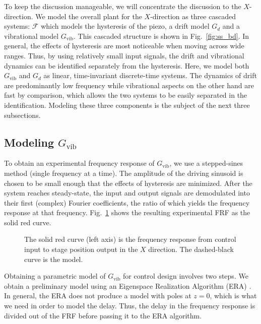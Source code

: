 \documentclass[twocolumn,twoside]{IEEEtran}
\newcommand{\Gv}{\ensuremath{G_{\text{vib}}}\xspace}
\begin{document}
To keep the discussion manageable, we will concentrate the discussion to the $X$-direction. We model the overall plant for the $X$-direction as three cascaded systems: $\mathcal{F}$ which models the hysteresis of the piezo, a drift model $G_d$ and a vibrational model $\Gv$. This cascaded structure is shown in Fig.~\ref{fig:ss_bd}. In general, the effects of hysteresis are most noticeable when moving across wide ranges. Thus, by using relatively small input signals, the drift and vibrational dynamics can be identified separately from the hysteresis. Here, we model both $\Gv$ and $G_d$ as linear, time-invariant discrete-time systems. The dynamics of drift are predominantly low frequency while vibrational aspects on the other hand are fast by comparison, which allows the two systems to be easily separated in the identification.
 Modeling these three components is the subject of the next three subsections.


\subsection{Modeling \Gv}\label{sec:vib_model}
To obtain an experimental frequency response of $\Gv$, we use a stepped-sines method (single frequency at a time). The amplitude of the driving sinusoid is chosen to be small enough that the effects of hysteresis are minimized. After the system reaches steady-state, the input and output signals are demodulated into their first (complex) Fourier coefficients, the ratio of which yields the frequency response at that frequency. Fig.~\ref{fig:Guz2stage_frf} shows the resulting experimental FRF as the solid red curve.

\begin{figure}
  \centering
  
  \caption{The solid red curve (left axis) is the frequency response from control input to stage position output in the $X$ direction. The dashed-black curve is the model.}
  \label{fig:Guz2stage_frf}
\end{figure}

Obtaining a parametric model of $\Gv$ for control design involves two steps. We obtain a preliminary model using an Eigenspace Realization Algorithm (ERA) \cite{Jacques_sysidfrf}. In general, the ERA does not produce a model with poles at $z=0$, which is what we need in order to model the delay. Thus, the delay in the frequency response is divided out of the FRF before passing it to the ERA algorithm.
\end{document}
